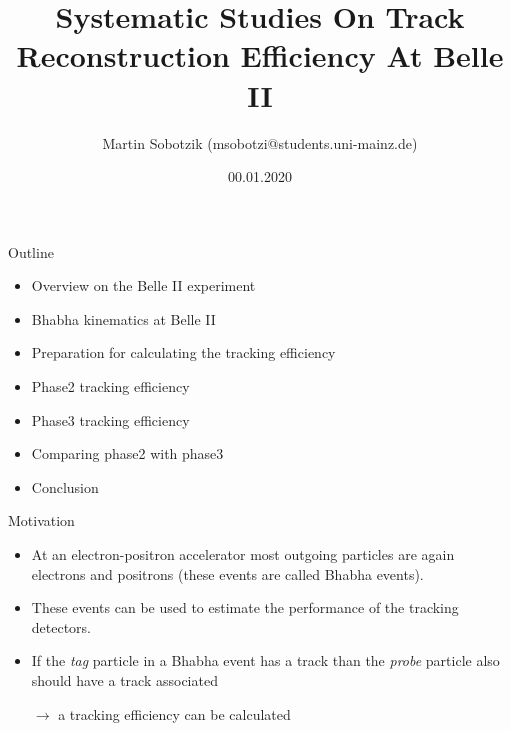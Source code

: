 \documentclass[8pt]{beamer}
\title{Systematic Studies On Track Reconstruction Efficiency At Belle II}
\date{00.01.2020}
\author{Martin Sobotzik (msobotzi@students.uni-mainz.de)}
\institute{Johannes Gutenberg-Universit\"at Mainz}
\begin{document}
\maketitle
%




\begin{frame}{Outline}




	\begin{itemize}
		\item Overview on the Belle II experiment
		\item Bhabha kinematics at Belle II
		\item Preparation for calculating the tracking efficiency
		\item Phase2 tracking efficiency
		\item Phase3 tracking efficiency
		\item Comparing phase2 with phase3
		\item Conclusion
		
		
	\end{itemize}
\end{frame}



\begin{frame}{Motivation}
	\begin{itemize}
		\item At an electron-positron accelerator most outgoing particles are again electrons and positrons (these events are called Bhabha events).
		\item These events can be used to estimate the performance of the tracking detectors.
		\item If the \textit{tag} particle in a Bhabha event has a track than the \textit{probe} particle also should have a track associated 
		
		$\rightarrow$ a tracking efficiency can be calculated
	\end{itemize}
\end{frame}
\end{document}
